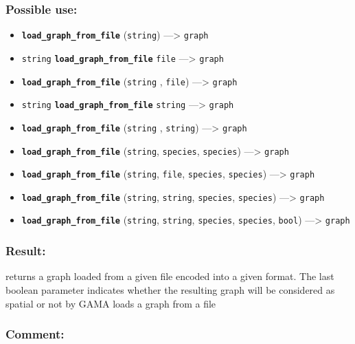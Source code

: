 \documentclass[]{book}
\providecommand{\tightlist}{%
  \setlength{\itemsep}{0pt}\setlength{\parskip}{0pt}}
\theoremstyle{definition}
\theoremstyle{definition}
\theoremstyle{definition}
\theoremstyle{remark}
\begin{document}
\subsubsection{Possible use:}\label{possible-use-326}

\begin{itemize}
\tightlist
\item
  \textbf{\texttt{load\_graph\_from\_file}} (\texttt{string})
  ---\textgreater{} \texttt{graph}
\item
  \texttt{string} \textbf{\texttt{load\_graph\_from\_file}}
  \texttt{file} ---\textgreater{} \texttt{graph}
\item
  \textbf{\texttt{load\_graph\_from\_file}} (\texttt{string} ,
  \texttt{file}) ---\textgreater{} \texttt{graph}
\item
  \texttt{string} \textbf{\texttt{load\_graph\_from\_file}}
  \texttt{string} ---\textgreater{} \texttt{graph}
\item
  \textbf{\texttt{load\_graph\_from\_file}} (\texttt{string} ,
  \texttt{string}) ---\textgreater{} \texttt{graph}
\item
  \textbf{\texttt{load\_graph\_from\_file}} (\texttt{string},
  \texttt{species}, \texttt{species}) ---\textgreater{} \texttt{graph}
\item
  \textbf{\texttt{load\_graph\_from\_file}} (\texttt{string},
  \texttt{file}, \texttt{species}, \texttt{species}) ---\textgreater{}
  \texttt{graph}
\item
  \textbf{\texttt{load\_graph\_from\_file}} (\texttt{string},
  \texttt{string}, \texttt{species}, \texttt{species}) ---\textgreater{}
  \texttt{graph}
\item
  \textbf{\texttt{load\_graph\_from\_file}} (\texttt{string},
  \texttt{string}, \texttt{species}, \texttt{species}, \texttt{bool})
  ---\textgreater{} \texttt{graph}
\end{itemize}

\subsubsection{Result:}\label{result-316}

returns a graph loaded from a given file encoded into a given format.
The last boolean parameter indicates whether the resulting graph will be
considered as spatial or not by GAMA loads a graph from a file

\subsubsection{Comment:}\label{comment-62}
\end{document}
